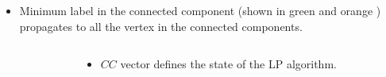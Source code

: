 \begin{itemize}
\item Minimum label in the connected component (shown in {\color{green} green} and {\color{orange} orange} ) propagates to all the vertex in the connected components. 
\end{itemize}
\lyxframeend{}

\begin{columns}
\begin{column}{0.5\textwidth}  %

\end{column}

\begin{column}{0.5\textwidth}
   \begin{itemize}
   \item<1-> $CC$ vector defines the state of the LP algorithm.
   
   \end{itemize}
\end{column}

\end{columns}



